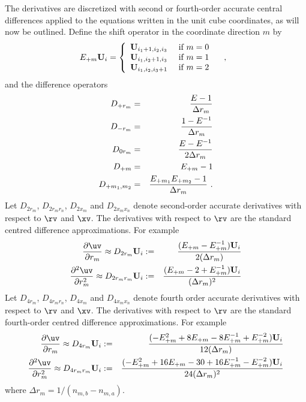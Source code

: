 The derivatives are discretized with second or
fourth-order accurate central differences applied to the
equations written in the unit cube coordinates, as will now be outlined.
Define the shift operator in the coordinate direction $m$ by
\begin{equation}
    E_{+m}{\bf U}_{i} = \left\{ \begin{array}{ll}
                 {\bf U}_{i_1+1,i_2,i_3} & \mbox{ if $m=0$} \\
                 {\bf U}_{i_1,i_2+1,i_3} & \mbox{ if $m=1$} \\
                 {\bf U}_{i_1,i_2,i_3+1} & \mbox{ if $m=2$}
                     \end{array}\right. ~~~,~~
\end{equation}
and the difference operators
\begin{eqnarray*}
     D_{+ r_m} &=& {E - 1 \over \Delta r_m}  \\
     D_{- r_m} &=& {1 - E^{-1} \over \Delta r_m}  \\
     D_{0 r_m} &=& {E-E^{-1} \over 2 \Delta r_m}  \\
     D_{+m} &=& E_{+m} -1  \\
     D_{+m_1,m_2} &=& {E_{+m_1} E_{+m_2} -1 \over \Delta r_m}  ~.
\end{eqnarray*}
Let $D_{2r_m}$, $D_{2r_m r_n}$, $D_{2x_m}$ and $D_{2x_m x_n}$
denote
second-order accurate derivatives with respect to $\rv$ and $\xv$.
The derivatives with respect to $\rv$ are the standard
centred difference approximations. For example
\begin{eqnarray*}
  {\partial \uv \over \partial r_m} \approx D_{2r_m}\uvd_i &:=&
     { (E_{+m} - E_{+m}^{-1}) \uvd_i
                                   \over 2(\Delta r_m) } \\
  {\partial^2 \uv \over \partial r_m^2} \approx D_{2 r_m r_m}\uvd_i &:=&
     { (E_{+m} -2 + E_{+m}^{-1}) \uvd_i
                                   \over (\Delta r_m)^2 }
\end{eqnarray*}
Let $D_{4r_m}$, $D_{4r_m r_n}$, $D_{4x_m}$ and $D_{4x_m x_n}$
denote
fourth order accurate derivatives with respect to $\rv$ and $\xv$.
The derivatives with respect to $\rv$ are the standard fourth-order
centred difference approximations. For example
\begin{eqnarray*}
  {\partial \uv \over \partial r_m} \approx D_{4r_m}\uvd_i &:=&
     { (-E_{+m}^2+ 8 E_{+m} - 8 E_{+m}^{-1} + E_{+m}^{-2} ) \uvd_i
                                   \over 12(\Delta r_m) } \\
  {\partial^2 \uv \over \partial r_m^2} \approx D_{4 r_m r_m}\uvd_i &:=&
     { (-E_{+m}^2+16 E_{+m} -30 +16 E_{+m}^{-1} -E_{+m}^{-2} ) \uvd_i
                                   \over 24(\Delta r_m)^2 }
\end{eqnarray*}
where $\Delta r_m = 1/(n_{m,b}-n_{m,a})$.

